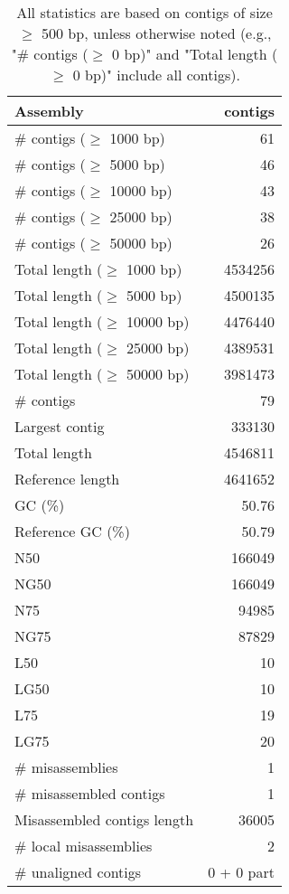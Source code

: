 \documentclass[12pt,a4paper]{article}
\begin{document}
\begin{table}[ht]
\begin{center}
\caption{All statistics are based on contigs of size $\geq$ 500 bp, unless otherwise noted (e.g., "\# contigs ($\geq$ 0 bp)" and "Total length ($\geq$ 0 bp)" include all contigs).}
\begin{tabular}{|l*{1}{|r}|}
\hline
Assembly & contigs \\ \hline
\# contigs ($\geq$ 1000 bp) & 61 \\ \hline
\# contigs ($\geq$ 5000 bp) & 46 \\ \hline
\# contigs ($\geq$ 10000 bp) & 43 \\ \hline
\# contigs ($\geq$ 25000 bp) & 38 \\ \hline
\# contigs ($\geq$ 50000 bp) & 26 \\ \hline
Total length ($\geq$ 1000 bp) & 4534256 \\ \hline
Total length ($\geq$ 5000 bp) & 4500135 \\ \hline
Total length ($\geq$ 10000 bp) & 4476440 \\ \hline
Total length ($\geq$ 25000 bp) & 4389531 \\ \hline
Total length ($\geq$ 50000 bp) & 3981473 \\ \hline
\# contigs & 79 \\ \hline
Largest contig & 333130 \\ \hline
Total length & 4546811 \\ \hline
Reference length & 4641652 \\ \hline
GC (\%) & 50.76 \\ \hline
Reference GC (\%) & 50.79 \\ \hline
N50 & 166049 \\ \hline
NG50 & 166049 \\ \hline
N75 & 94985 \\ \hline
NG75 & 87829 \\ \hline
L50 & 10 \\ \hline
LG50 & 10 \\ \hline
L75 & 19 \\ \hline
LG75 & 20 \\ \hline
\# misassemblies & 1 \\ \hline
\# misassembled contigs & 1 \\ \hline
Misassembled contigs length & 36005 \\ \hline
\# local misassemblies & 2 \\ \hline
\# unaligned contigs & 0 + 0 part \\ \hline

\end{tabular}
\end{center}
\end{table}
\end{document}
